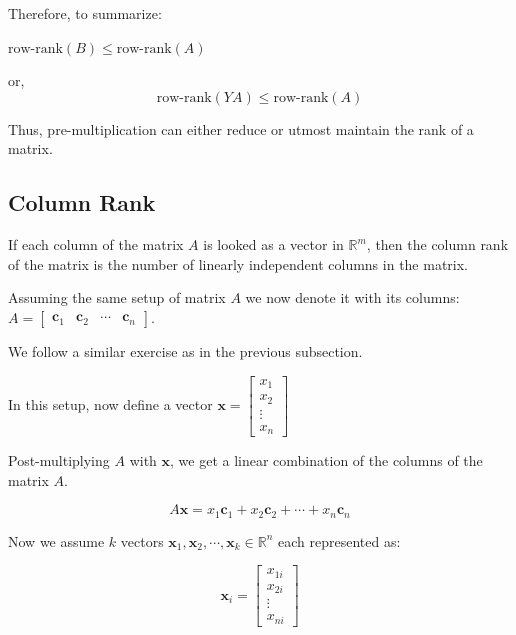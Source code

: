 \documentclass[a4paper]{article}
\begin{document}
Therefore, to summarize:

$\text{row-rank}(B) \leq \text{row-rank}(A)$

or, \begin{equation}
\text{row-rank}(YA) \leq \text{row-rank}(A)
\end{equation}

Thus, pre-multiplication can either reduce or utmost maintain the rank of a matrix.

\subsection*{Column Rank}

If each column of the matrix $A$ is looked as a vector in $\mathbb{R}^m$, then the column rank of the matrix is the number of linearly independent columns in the matrix.

Assuming the same setup of matrix $A$ we now denote it with its columns: $A = \begin{bmatrix}
\boldsymbol{c}_1 & \boldsymbol{c}_2 & \cdots & \boldsymbol{c}_n 
\end{bmatrix}$.

We follow a similar exercise as in the previous subsection.

In this setup, now define a vector $\boldsymbol{x}= \begin{bmatrix}
x_1 \\
x_2 \\
\vdots \\
x_n
\end{bmatrix}$

Post-multiplying $A$ with $\boldsymbol{x}$, we get a linear combination of the columns of the matrix $A$.

\begin{equation}
A \boldsymbol{x} = x_1\boldsymbol{c}_1 + x_2\boldsymbol{c}_2 + \cdots + x_n\boldsymbol{c}_n 
\end{equation}

Now we assume $k$ vectors $\boldsymbol{x}_1, \boldsymbol{x}_2, \cdots, \boldsymbol{x}_k \in \mathbb{R}^n$ each represented as:

\begin{equation}
\boldsymbol{x}_i = \begin{bmatrix}
x_{1i}\\
x_{2i}\\
\vdots \\
x_{ni}
\end{bmatrix}
\end{equation}
\end{document}
